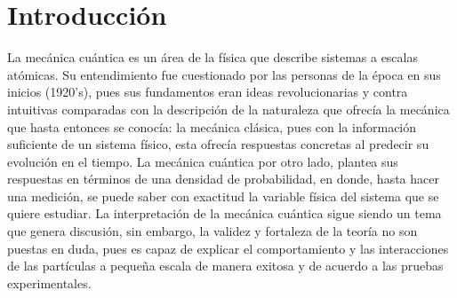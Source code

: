 \chapter{Introducción}\label{ch:introduccion}

\noindent La mecánica cuántica es un área de la física que describe sistemas a escalas atómicas. Su entendimiento fue cuestionado por las personas de la época en sus inicios (1920's), pues sus fundamentos eran ideas revolucionarias y contra intuitivas comparadas con la descripción de la naturaleza que ofrecía la mecánica que hasta entonces se conocía: la mecánica clásica, pues con la información suficiente de un sistema físico, esta ofrecía respuestas concretas al predecir su evolución en el tiempo. La mecánica cuántica por otro lado, plantea sus respuestas en términos de una densidad de probabilidad, en donde, hasta hacer una medición, se puede saber con exactitud la variable física del sistema que se quiere estudiar. La interpretación de la mecánica cuántica sigue siendo un tema que genera discusión, sin embargo, la validez y fortaleza de la teoría no son puestas en duda, pues es capaz de explicar el comportamiento y las interacciones de las partículas a pequeña escala de manera exitosa y de acuerdo a las pruebas experimentales.
\\

